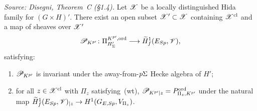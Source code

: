 \begin{theorem}
  \label{thm:TheoremC}
  \textit{Source: Disegni, Theorem~C (§1.4).}
  Let $\mathscr{X}$ be a locally distinguished Hida family for $(G \times H)'$.
  There exist an open subset $\mathscr{X}' \subset \mathscr{X}$ containing
  $\mathscr{X}^{\mathrm{cl}}$ and a map of sheaves over $\mathscr{X}'$
  \[
    \mathscr{P}_{K^{p\prime}} \colon
    \Pi^{K^{p\prime},\mathrm{ord}}_{H'_\Sigma}
    \longrightarrow \widetilde{H}^1_f(E_{Sp}, \mathscr{V}),
  \]
  satisfying:
  \begin{enumerate}
    \item $\mathscr{P}_{K^{p\prime}}$ is invariant under the away-from-$p\Sigma$
          Hecke algebra of $H'$;
    \item for all $z \in \mathscr{X}^{\mathrm{cl}}$ with $\Pi_z$ satisfying~(wt),
          $\mathscr{P}_{K^{p\prime}|z} = P^{\mathrm{ord}}_{\Pi_z, K^{p\prime}}$ under the
          natural map
          $\widetilde{H}^1_f(E_{Sp},\mathscr{V})_{|z} \to H^1(G_{E,Sp}, V_{\Pi_z})$.
  \end{enumerate}
\end{theorem}

